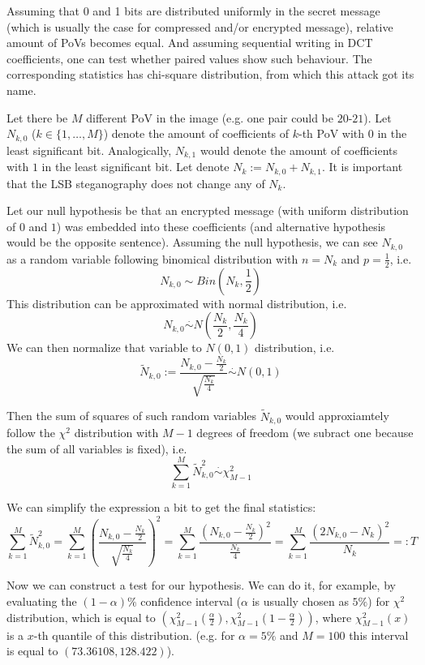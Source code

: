 Assuming that 0 and 1 bits are distributed uniformly in the secret message 
(which is usually the case for compressed and/or encrypted message), relative
amount of PoVs becomes equal. And assuming sequential writing in DCT coefficients, one can test
whether paired values show such behaviour. The corresponding statistics has chi-square
distribution, from which this attack got its name.

Let there be $M$ different PoV in the image (e.g. one pair could be $20$-$21$). Let $N_{k, 0}$ ($k \in \{ 1, \ldots, M\}$)
denote the amount of coefficients of $k$-th PoV with $0$ in the least significant bit. Analogically,
$N_{k, 1}$ would denote the amount of coefficients with $1$ in the least significant bit. 
Let denote $N_k := N_{k, 0} + N_{k, 1}$. It is important that the LSB steganography does not change
any of $N_k$.
 
Let our null hypothesis be that an encrypted message (with uniform distribution of $0$ and $1$) 
was embedded into these coefficients (and alternative 
hypothesis would be the opposite sentence). Assuming the null hypothesis, we can see $N_{k, 0}$ as a random
variable following binomical distribution with $n = N_k$ and $p = \frac{1}{2}$, i.e.
$$N_{k, 0} \sim Bin\left(N_k, \frac{1}{2}\right)$$
This distribution can be approximated with normal distribution, i.e.
$$N_{k, 0} \overset{\cdot}{\sim} N\left(\frac{N_k}{2}, \frac{N_k}{4}\right)$$
We can then normalize that variable to $N(0, 1)$ distribution, i.e.
$$ \tilde{N}_{k, 0} := \frac{N_{k, 0} - \frac{N_k}{2}}{\sqrt{\frac{N_k}{4}}}  \overset{\cdot}{\sim} N( 0, 1)$$

Then the sum of squares of such random variables $\tilde{N}_{k, 0}$ would approxiamtely follow the $\chi^2$ distribution with $M-1$
degrees of freedom (we subract one because the sum of all variables is fixed), i.e.
$$\sum_{k = 1}^{M} \tilde{N}^{2}_{k, 0} \overset{\cdot}{\sim} \chi^2_{M-1}$$

We can simplify the expression a bit to get the final statistics: 
$$\sum_{k = 1}^{M} \tilde{N}^{2}_{k, 0} = 
\sum_{k = 1}^{M} \left(  \frac{N_{k, 0} - \frac{N_k}{2}}{\sqrt{\frac{N_k}{4}}}  \right)^2 =
\sum_{k = 1}^{M} \frac{\left(N_{k, 0} - \frac{N_k}{2}\right)^2}{\frac{N_k}{4}} = 
\sum_{k = 1}^{M} \frac{\left(2 N_{k, 0} - N_k\right)^2}{N_k}
=: T
$$ 

Now we can construct a test for our hypothesis. We can do it, for example, by evaluating
the $(1 - \alpha)\%$ confidence interval ($\alpha$ is usually chosen as $5\%$) for $\chi^2$ distribution, which is equal to 
$\left( \chi^2_{M-1}\left(\frac{\alpha}{2}\right), \chi^2_{M-1}\left(1 - \frac{\alpha}{2}\right) \right)$, where $\chi^2_{M-1}(x)$ 
is a $x$-th quantile of this distribution.
(e.g. for $\alpha = 5\%$
and $M=100$ this interval is equal to $(73.36108, 128.422)$). 

